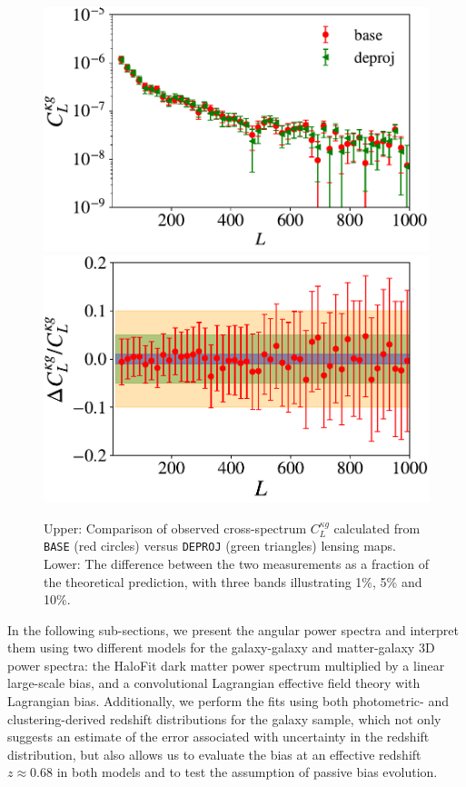 \begin{figure}
\includegraphics[width=0.9\linewidth]{figures/basevdeproj.pdf}
\vspace{1cm}
\includegraphics[width=0.9\linewidth]{figures/basevdeproj_frac.pdf}
\caption{Upper: Comparison of observed cross-spectrum $C_{L}^{\kappa g}$ calculated from \texttt{BASE} (red circles) versus \texttt{DEPROJ} (green triangles) lensing maps. Lower: The difference between the two measurements as a fraction of the theoretical prediction, with three bands illustrating 1\%, 5\% and 10\%.}
\label{fig:basevdeproj}
\end{figure}

In the following sub-sections, we present the angular power spectra and interpret them using two different models for the galaxy-galaxy and matter-galaxy 3D power spectra: the HaloFit dark matter power spectrum multiplied by a linear large-scale bias, and a convolutional Lagrangian effective field theory with Lagrangian bias. Additionally, we perform the fits using both photometric- and clustering-derived redshift distributions for the galaxy sample, which not only suggests an estimate of the error associated with uncertainty in the redshift distribution, but also allows us to evaluate the bias at an effective redshift $z \approx 0.68$ in both models and to test the assumption of passive bias evolution. 


